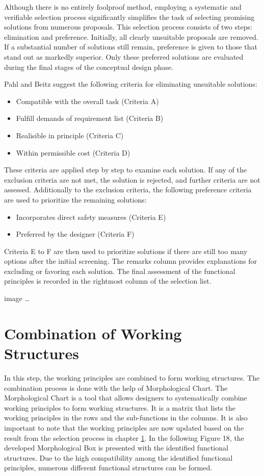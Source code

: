 Although there is no entirely foolproof method, employing a systematic and verifiable selection process significantly simplifies the task of selecting promising solutions from numerous proposals. This selection process consists of two steps: elimination and preference. Initially, all clearly unsuitable proposals are removed. If a substantial number of solutions still remain, preference is given to those that stand out as markedly superior. Only these preferred solutions are evaluated during the final stages of the conceptual design phase.

Pahl and Beitz suggest the following criteria for eliminating unsuitable solutions:
\begin{itemize}
    \item Compatible with the overall task (Criteria A)
    \item Fulfill demands of requirement list (Criteria B)
    \item Realisible in principle (Criteria C)
    \item Within permissible cost (Criteria D)
\end{itemize}

These criteria are applied step by step to examine each solution. If any of the exclusion criteria are not met, the solution is rejected, and further criteria are not assessed. Additionally to the exclusion criteria, the following preference criteria are used to prioritize the remaining solutions:

\begin{itemize}
    \item Incorporates direct safety measures (Criteria E)
    \item Preferred by the designer (Criteria F)
\end{itemize}

Criteria E to F are then used to prioritize solutions if there are still too many options after the initial screening. The remarks column provides explanations for excluding or favoring each solution. The final assessment of the functional principles is recorded in the rightmost column of the selection list.

image \dots

\section{Combination of Working Structures}

In this step, the working principles are combined to form working structures. The combination process is done with the help of Morphological Chart. The Morphological Chart is a tool that allows designers to systematically combine working principles to form working structures. It is a matrix that lists the working principles in the rows and the sub-functions in the columns. It is also important to note that the working principles are now updated based on the result from the selection process in chapter \ref{}.
In the following Figure 18, the developed Morphological Box is presented with the identified functional structures. Due to the high compatibility among the identified functional principles, numerous different functional structures can be formed.

